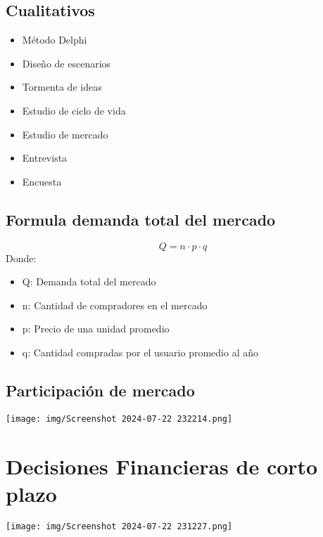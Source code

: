 \documentclass{templateNote}
\begin{document}
\subsection{Cualitativos}
\begin{itemize}
    \item Método Delphi
    \item Diseño de escenarios
    \item Tormenta de ideas
    \item Estudio de ciclo de vida
    \item Estudio de mercado
    \item Entrevista
    \item Encuesta
\end{itemize}

\subsection{Formula demanda total del mercado}
\begin{equation*}
    Q = n \cdot p \cdot q
\end{equation*}
Donde:
\begin{itemize}
    \item Q: Demanda total del mercado
    \item n: Cantidad de compradores en el mercado
    \item p: Precio de una unidad promedio
    \item q: Cantidad compradas por el usuario promedio al año
\end{itemize}

\subsection{Participación de mercado}
\begin{center}
    \texttt{[image: img/Screenshot 2024-07-22 232214.png]}
\end{center}
\section{Decisiones Financieras de corto plazo}
\begin{center}
    \texttt{[image: img/Screenshot 2024-07-22 231227.png]}
\end{center}
\end{document}
